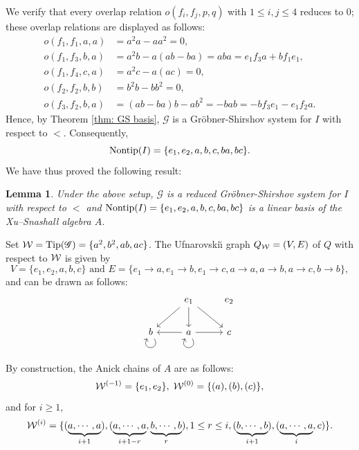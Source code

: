 \documentclass[10pt, reqno]{amsart}
\newtheorem{lem}[theorem]{Lemma}
\theoremstyle{definition}
\theoremstyle{remark}
\numberwithin{equation}{section}
\begin{document}
We verify that every overlap relation \(o(f_i, f_j, p, q)\) with \(1 \le i,j \le 4\) reduces to \(0\); these overlap relations are displayed as follows:
\[
\begin{aligned}
o(f_1, f_1, a, a) &= a^2a - aa^2 = 0,\\
o(f_1, f_3, b, a) &= a^2b - a(ab - ba) = aba = e_1f_3a + bf_1e_1 ,\\
o(f_1, f_4, c, a) &= a^2c - a(ac) = 0,\\
o(f_2, f_2, b, b) &= b^2b - bb^2 = 0,\\
o(f_3, f_2, b, a) &= (ab - ba)b - ab^2 = -bab =-bf_3e_1 -e_1f_2a.
\end{aligned}
\]
Hence, by Theorem \ref{thm: GS basis}, \(\mathscr{G}\) is a Gröbner-Shirshov system for \(I\) with respect to \(<\). Consequently,
\[  \mathrm{Nontip}(I) =\{e_1,e_2, a, b, c, ba, bc\}.\]
We have thus proved the following result:
\begin{lem}Under the above setup, 
\(\mathscr{G}\) is a reduced Gröbner-Shirshov system for \(I\) with respect to \(<\) and 
$\mathrm{Nontip}(I) =\{e_1, e_2, a, b, c, ba, bc\}$ is a linear basis of the Xu--Snashall algebra $A$. 
\end{lem}

Set \(\mathcal{W}=\mathrm{Tip}(\mathscr{G})=\{a^2, b^2, ab, ac\}\).  The Ufnarovski\u{\i} graph \(Q_{\mathcal{W}}=(V,E)\) of \(Q\) with respect to \(\mathcal{W}\) is given by 
\[V=\{e_1, e_2, a, b, c\} \text{ and }
E= \{e_1 \to a, e_1 \to b, e_1 \to c, a\to a, a\to b, a\to c, b\to b\},\]
and can be drawn as follows:
\[
\begin{tikzcd}
&& e_1 \arrow[ld]  \arrow[d]  \arrow[rd] & e_2\\
 &   b \arrow[loop below, out =300, in =240, looseness=5] & a \arrow[loop below,out =300, in =240, looseness=5] \arrow[l]\arrow[r] & c
\end{tikzcd}
\]

By construction, the Anick  chains of \(A\) are as follows:
\[ 
    \mathcal{W}^{(-1)}= \{e_1, e_2\}, \; \mathcal{W}^{(0)}= \{(a), (b), (c)\},\]
    and for $i\ge 1$, 
    $$\mathcal{W}^{(i)}=\{(\underbrace{a, \cdots,a}_{i+1}), (\underbrace{a, \cdots,a}_{i+1-r}, \underbrace{b, \cdots, b}_{r}), 1 \le r \le i , (\underbrace{b, \cdots,b}_{i+1}), (\underbrace{a, \cdots,a}_{i}, c)\}.$$
 
\end{document}
